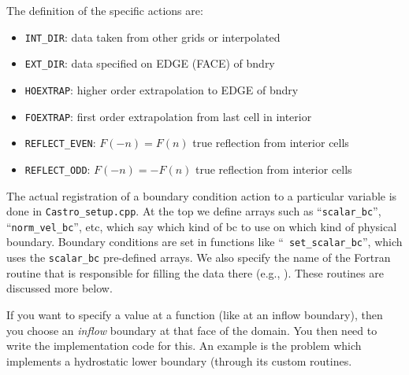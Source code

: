 The definition of the specific actions are:
\begin{itemize}
\item {\tt INT\_DIR}: data taken from other grids or interpolated

\item {\tt EXT\_DIR}: data specified on EDGE (FACE) of bndry

\item {\tt HOEXTRAP}: higher order extrapolation to EDGE of bndry

\item {\tt FOEXTRAP}: first order extrapolation from last cell in interior

\item {\tt REFLECT\_EVEN}: $F(-n) = F(n)$ true reflection from interior cells

\item {\tt REFLECT\_ODD}: $F(-n) = -F(n)$ true reflection from interior cells
\end{itemize}


The actual registration of a boundary condition action to a particular
variable is done in {\tt Castro\_setup.cpp}. At the top we define
arrays such as ``{\tt scalar\_bc}'', ``{\tt norm\_vel\_bc}'', etc,
which say which kind of bc to use on which kind of physical boundary.
Boundary conditions are set in functions like ``{\tt
  set\_scalar\_bc}'', which uses the {\tt scalar\_bc} pre-defined
arrays.  We also specify the name of the Fortran routine that
is responsible for filling the data there (e.g., ).
These routines are discussed more below.


If you want to specify a value at a function (like at an inflow
boundary), then you choose an {\em inflow} boundary at that face of
the domain.  You then need to write the implementation code for this.
An example is the problem  which implements a
hydrostatic lower boundary (through its custom 
routines.

